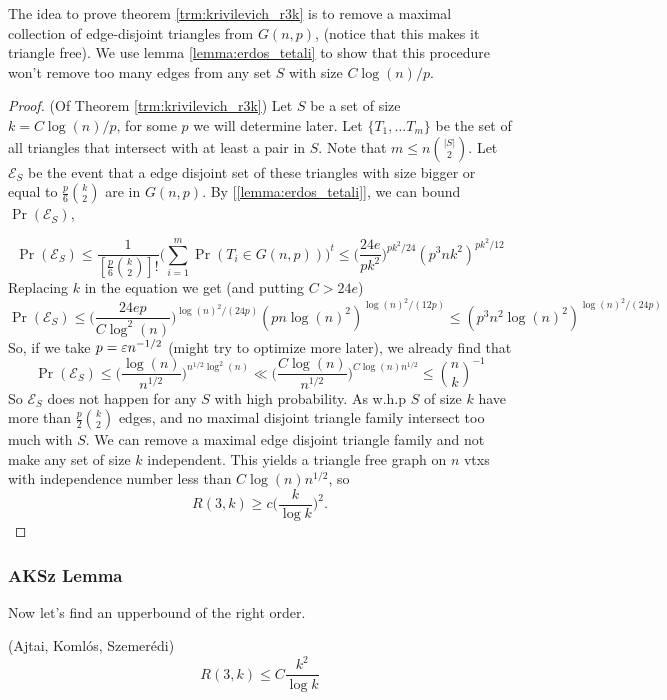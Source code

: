 The idea to prove theorem \ref{trm:krivilevich_r3k} is to remove a
maximal collection of edge-disjoint triangles from $G(n,p)$, (notice
that this makes it triangle free).
We use lemma \ref{lemma:erdos_tetali} to show that this procedure
won't remove too many edges from any set $S$ with size $C\log(n)/p$.

\begin{proof}
	(Of Theorem \ref{trm:krivilevich_r3k}) Let $S$ be a set of size $k
	= C\log(n)/p$, for some $p$ we will determine later.
	Let $\{T_1, \dots T_m\}$ be the set of all triangles that intersect
	with at least a pair in $S$. Note that $m \leq n\binom{|S|}{2}$.
	Let $\mathcal{E}_S$ be the event that a edge disjoint set of these
	triangles with size bigger or equal to $\frac{p}{6}\binom{k}{2}$
	are in $G(n,p)$.
	By [\ref{lemma:erdos_tetali}], we can bound $\Pr(\mathcal{E}_S)$,

	\[
		\Pr(\mathcal{E}_S) \leq
		\frac{1}{[\frac{p}{6}\binom{k}{2}]!}\bigg(\sum_{i = 1}^{m}
		\Pr(T_i \in G(n,p))\bigg)^t \leq
		\bigg(\frac{24e}{pk^2}\bigg)^{pk^2/24}(p^3nk^2)^{pk^2/12}
	\]
	Replacing $k$ in the equation we get (and putting $C > 24e$)
	\[
		\Pr(\mathcal{E}_S) \leq
		\bigg(\frac{24ep}{C\log^2(n)}\bigg)^{\log(n)^2/(24p)}
		(pn\log(n)^2)^{\log(n)^2/(12p)}
		\leq (p^3n^2\log(n)^2)^{\log(n)^2/(24p)}
	\]
	So, if we take $p = \varepsilon n^{-1/2}$ (might try to optimize more
	later), we already find that
	\[
		\Pr(\mathcal{E}_S) \leq
		\bigg(\frac{\log(n)}{n^{1/2}}\bigg)^{n^{1/2}\log^2(n)} \ll
		\bigg(\frac{C\log(n)}{n^{1/2}}\bigg)^{C\log(n)n^{1/2}} \leq
		\binom{n}{k}^{-1}
	\]
	So $\mathcal{E}_S$ does not happen for any $S$ with high
	probability. As w.h.p $S$ of size $k$ have more than
	$\frac{p}{2}\binom{k}{2}$ edges, and
	no maximal disjoint triangle family intersect too much with $S$. We
	can remove a maximal edge disjoint triangle family and not make any
	set of size $k$ independent.
	This yields a triangle free graph on $n$ vtxs with independence
	number less than $C\log(n)n^{1/2}$, so
	\[
		R(3,k) \geq c\bigg(\frac{k}{\log k}\bigg)^2.
	\]
\end{proof}

\subsubsection{AKSz Lemma}
Now let's find an upperbound of the right order.
\begin{theorem}
	\label{trm:r3k_aks}
	(Ajtai, Komlós, Szemerédi)
	\[
		R(3,k) \leq C\frac{k^2}{\log k}
	\]
\end{theorem}

